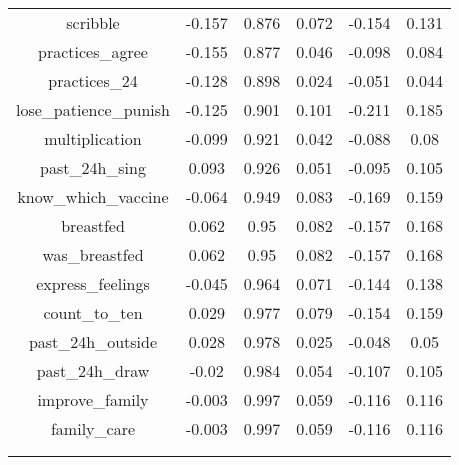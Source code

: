 \begin{table}[!htbp]
\begin{tabular}{@{\extracolsep{5pt}} cccccc}
scribble & -0.157 & 0.876 & 0.072 & -0.154 & 0.131 \\ 
practices\_agree & -0.155 & 0.877 & 0.046 & -0.098 & 0.084 \\ 
practices\_24 & -0.128 & 0.898 & 0.024 & -0.051 & 0.044 \\ 
lose\_patience\_punish & -0.125 & 0.901 & 0.101 & -0.211 & 0.185 \\ 
multiplication & -0.099 & 0.921 & 0.042 & -0.088 & 0.08 \\ 
past\_24h\_sing & 0.093 & 0.926 & 0.051 & -0.095 & 0.105 \\ 
know\_which\_vaccine & -0.064 & 0.949 & 0.083 & -0.169 & 0.159 \\ 
breastfed & 0.062 & 0.95 & 0.082 & -0.157 & 0.168 \\ 
was\_breastfed & 0.062 & 0.95 & 0.082 & -0.157 & 0.168 \\ 
express\_feelings & -0.045 & 0.964 & 0.071 & -0.144 & 0.138 \\ 
count\_to\_ten & 0.029 & 0.977 & 0.079 & -0.154 & 0.159 \\ 
past\_24h\_outside & 0.028 & 0.978 & 0.025 & -0.048 & 0.05 \\ 
past\_24h\_draw & -0.02 & 0.984 & 0.054 & -0.107 & 0.105 \\ 
improve\_family & -0.003 & 0.997 & 0.059 & -0.116 & 0.116 \\ 
family\_care & -0.003 & 0.997 & 0.059 & -0.116 & 0.116 \\ 
 &  &  &  &  &  \\ 
\hline \\[-1.8ex] 
\end{tabular} 
\end{table} 
